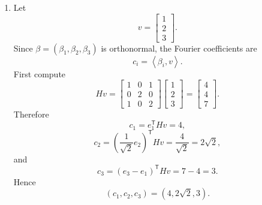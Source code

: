 \documentclass[12pt]{article}
\newcommand{\ip}[2]{\left\langle #1,#2\right\rangle}
\newcommand{\T}{\mathsf{T}}
\begin{document}
\begin{enumerate}[label=(\alph*)]
  \item Let
  \[
    v=\begin{bmatrix}1\\2\\3\end{bmatrix}.
  \]
  Since $\beta=(\beta_1,\beta_2,\beta_3)$ is orthonormal, the Fourier coefficients are
  \[
    c_i=\ip{\beta_i}{v}.
  \]
  First compute
  \[
    Hv=
    \begin{bmatrix}
      1&0&1\\
      0&2&0\\
      1&0&2
    \end{bmatrix}
    \begin{bmatrix}1\\2\\3\end{bmatrix}
    =
    \begin{bmatrix}4\\4\\7\end{bmatrix}.
  \]
  Therefore
  \[
    c_1=e_1^\T Hv=4,
  \]
  \[
    c_2=\left(\frac{1}{\sqrt2}e_2\right)^\T Hv=\frac{4}{\sqrt2}=2\sqrt2,
  \]
  and
  \[
    c_3=(e_3-e_1)^\T Hv=7-4=3.
  \]
  Hence
  \[
    \boxed{(c_1,c_2,c_3)=(4,2\sqrt2,3).}
  \]
\end{enumerate}

\newpage
\end{document}
